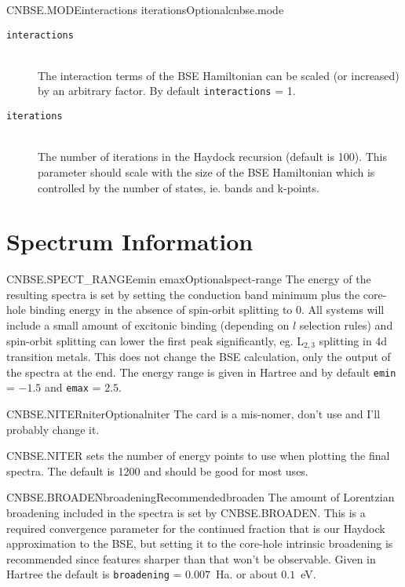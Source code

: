 \documentclass[11pt]{report}
\begin{document}
\begin{Card}{CNBSE.MODE}{interactions iterations}{Optional}{cnbse.mode}
\begin{description}
\item[\texttt{interactions}]\hfill\\ The interaction terms of the BSE Hamiltonian can be scaled (or increased) by an arbitrary factor. By default \texttt{interactions} = 1.
\item[\texttt{iterations}]\hfill\\ The number of iterations in the Haydock recursion (default is 100). This parameter should scale with the size of the BSE Hamiltonian which is controlled by the number of states, ie. bands and k-points.
\end{description}
\end{Card}

\section{Spectrum Information}
\label{sec:Spectrum-Information}

\begin{Card}{CNBSE.SPECT\_RANGE}{emin emax}{Optional}{spect-range}
The energy of the resulting spectra is set by setting the conduction band minimum plus the core-hole binding energy in the absence of spin-orbit splitting to 0. All systems will include a small amount of excitonic binding (depending on $l$ selection rules) and spin-orbit splitting can lower the first peak significantly, eg. L$_{2,3}$ splitting in 4d transition metals. This does not change the BSE calculation, only the output of the spectra at the end. The energy range is given in Hartree and by default \texttt{emin} = $-1.5$ and \texttt{emax} = $2.5$.
\end{Card}

\begin{Card}{CNBSE.NITER}{niter}{Optional}{niter}
The card is a mis-nomer, don't use and I'll probably change it.

CNBSE.NITER sets the number of energy points to use when plotting the final spectra. The default is 1200 and should be good for most uses.
\end{Card}

\begin{Card}{CNBSE.BROADEN}{broadening}{Recommended}{broaden}
The amount of Lorentzian broadening included in the spectra is set by CNBSE.BROADEN. This is a required convergence parameter for the continued fraction that is our Haydock approximation to the BSE, but setting it to the core-hole intrinsic broadening is recommended since features sharper than that won't be observable. Given in Hartree the default is \texttt{broadening} = $0.007$~Ha. or about $0.1$~eV.
\end{Card}
\end{document}
